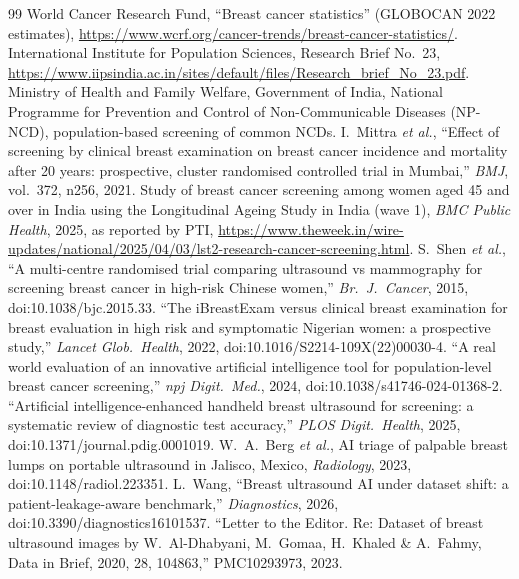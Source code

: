 \begin{thebibliography}{99}\small\itemsep0pt
 World Cancer Research Fund, ``Breast cancer statistics'' (GLOBOCAN 2022 estimates), \url{https://www.wcrf.org/cancer-trends/breast-cancer-statistics/}.
 International Institute for Population Sciences, Research Brief No.~23, \url{https://www.iipsindia.ac.in/sites/default/files/Research_brief_No_23.pdf}.
 Ministry of Health and Family Welfare, Government of India, National Programme for Prevention and Control of Non-Communicable Diseases (NP-NCD), population-based screening of common NCDs.
 I.~Mittra \emph{et al.}, ``Effect of screening by clinical breast examination on breast cancer incidence and mortality after 20 years: prospective, cluster randomised controlled trial in Mumbai,'' \emph{BMJ}, vol.~372, n256, 2021.
 Study of breast cancer screening among women aged 45 and over in India using the Longitudinal Ageing Study in India (wave 1), \emph{BMC Public Health}, 2025, as reported by PTI, \url{https://www.theweek.in/wire-updates/national/2025/04/03/lst2-research-cancer-screening.html}.
 S.~Shen \emph{et al.}, ``A multi-centre randomised trial comparing ultrasound vs mammography for screening breast cancer in high-risk Chinese women,'' \emph{Br.\ J.\ Cancer}, 2015, doi:10.1038/bjc.2015.33.
 ``The iBreastExam versus clinical breast examination for breast evaluation in high risk and symptomatic Nigerian women: a prospective study,'' \emph{Lancet Glob.\ Health}, 2022, doi:10.1016/S2214-109X(22)00030-4.
 ``A real world evaluation of an innovative artificial intelligence tool for population-level breast cancer screening,'' \emph{npj Digit.\ Med.}, 2024, doi:10.1038/s41746-024-01368-2.
 ``Artificial intelligence-enhanced handheld breast ultrasound for screening: a systematic review of diagnostic test accuracy,'' \emph{PLOS Digit.\ Health}, 2025, doi:10.1371/journal.pdig.0001019.
 W.~A.~Berg \emph{et al.}, AI triage of palpable breast lumps on portable ultrasound in Jalisco, Mexico, \emph{Radiology}, 2023, doi:10.1148/radiol.223351.
 L.~Wang, ``Breast ultrasound AI under dataset shift: a patient-leakage-aware benchmark,'' \emph{Diagnostics}, 2026, doi:10.3390/diagnostics16101537.
 ``Letter to the Editor. Re: Dataset of breast ultrasound images by W.~Al-Dhabyani, M.~Gomaa, H.~Khaled \& A.~Fahmy, Data in Brief, 2020, 28, 104863,'' PMC10293973, 2023.

\end{thebibliography}
